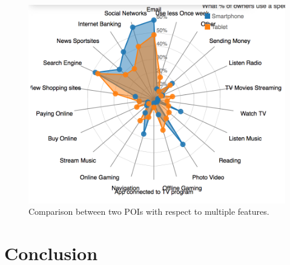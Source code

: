 \documentclass[sigconf]{acmart}
\begin{document}
\begin{figure}[t!]
\includegraphics[width=0.9\linewidth]{figure/sample_radar.png}
\caption{Comparison between two POIs with respect to multiple features.}
\label{fig:radar}
\end{figure}


\section{Conclusion}



 
\end{document}
